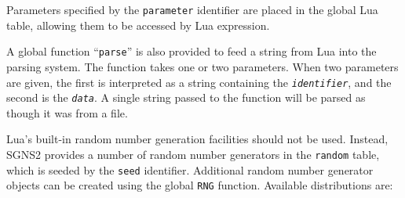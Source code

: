 \documentclass[10pt]{article}
\newcommand{\code}[1]{{\tt {#1}}}
\newcommand{\codeparam}[1]{\textrm{\textit{#1}}}
\begin{document}
Parameters specified by the \code{parameter} identifier are placed in the global Lua table, allowing them to be accessed by Lua expression.

A global function ``\code{parse}'' is also provided to feed a string from Lua into the parsing system. The function takes one or two parameters. When two parameters are given, the first is interpreted as a string containing the \code{\codeparam{identifier}}, and the second is the \code{\codeparam{data}}. A single string passed to the function will be parsed as though it was from a file.

Lua's built-in random number generation facilities should not be used. Instead, SGNS2 provides a number of random number generators in the \code{random} table, which is seeded by the \code{seed} identifier. Additional random number generator objects can be created using the global \code{RNG} function. Available distributions are:
\end{document}
